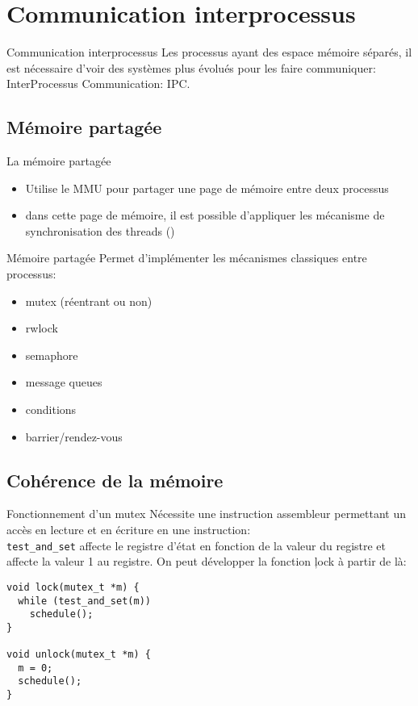 \section{Communication interprocessus}

\begin{frame}[fragile]{Communication interprocessus}
  Les processus  ayant des espace  mémoire séparés, il  est nécessaire
  d'voir des systèmes plus évolués pour les faire communiquer:\\
  InterProcessus Communication: IPC.
\end{frame}

\subsection{Mémoire partagée}

\begin{frame}[fragile=singleslide]{La mémoire partagée}
  \begin{itemize}
  \item Utilise  le MMU pour partager  une page de  mémoire entre deux
    processus
  \item dans  cette page de  mémoire, il est possible  d'appliquer les
    mécanisme        de       synchronisation        des       threads
    ()
  \end{itemize}
\end{frame}

\begin{frame}[fragile]{Mémoire partagée}
  Permet d'implémenter les mécanismes classiques entre processus:
  \begin{itemize}
  \item mutex (réentrant ou non)
  \item rwlock
  \item semaphore
  \item message queues
  \item conditions
  \item barrier/rendez-vous
  \end{itemize}
\end{frame}

\subsection{Cohérence de la mémoire}

\begin{frame}[fragile]{Fonctionnement d'un mutex}
  Nécessite une instruction assembleur  permettant un accès en lecture
  et en écriture  en une instruction: \\
  \texttt{test\_and\_set} affecte le registre d'état en fonction de la
  valeur  du registre  et affecte  la valeur  1 au  registre.  On peut
  développer la fonction \c{lock} à partir de là:
  \begin{lstlisting}
void lock(mutex_t *m) {
  while (test_and_set(m))
    schedule();
}

void unlock(mutex_t *m) {
  m = 0;
  schedule();
}
  \end{lstlisting}
\end{frame}

